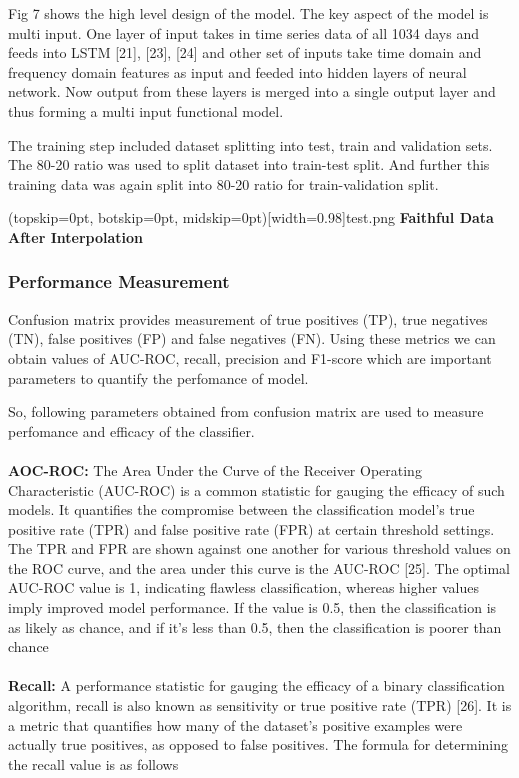 \documentclass{ieeeaccess}
\begin{document}
Fig 7 shows the high level design of the model. The key aspect of the model is multi input. One layer of input takes in time series data of all 1034 days and feeds into LSTM [21], [23], [24] and other set of inputs take time domain and frequency domain features as input and feeded into hidden layers of neural network. Now output from these layers is merged into a single output layer and thus forming a multi input functional model.

The training step included dataset splitting into test, train and validation sets. The 80-20 ratio was used to split dataset into train-test split. And further this training data was again split into 80-20 ratio for train-validation split.

\Figure[t!](topskip=0pt, botskip=0pt, midskip=0pt)[width=0.98\linewidth]{test.png}
{ \textbf{Faithful Data After Interpolation}\label{fig7}}

\subsubsection{Performance Measurement}
Confusion matrix provides measurement of true positives (TP), true negatives (TN), false positives (FP) and false negatives (FN). Using these metrics we can obtain values of AUC-ROC, recall, precision and F1-score which are important parameters to quantify the perfomance of model.

So, following parameters obtained from confusion matrix are used to measure perfomance and efficacy of the classifier.
\\
\\
\textbf{AOC-ROC:} The Area Under the Curve of the Receiver Operating Characteristic (AUC-ROC) is a common statistic for gauging the efficacy of such models. It quantifies the compromise between the classification model's true positive rate (TPR) and false positive rate (FPR) at certain threshold settings. The TPR and FPR are shown against one another for various threshold values on the ROC curve, and the area under this curve is the AUC-ROC [25]. The optimal AUC-ROC value is 1, indicating flawless classification, whereas higher values imply improved model performance. If the value is 0.5, then the classification is as likely as chance, and if it's less than 0.5, then the classification is poorer than chance
\\
\\
\textbf{Recall:} A performance statistic for gauging the efficacy of a binary classification algorithm, recall is also known as sensitivity or true positive rate (TPR) [26]. It is a metric that quantifies how many of the dataset's positive examples were actually true positives, as opposed to false positives. The formula for determining the recall value is as follows
\end{document}
